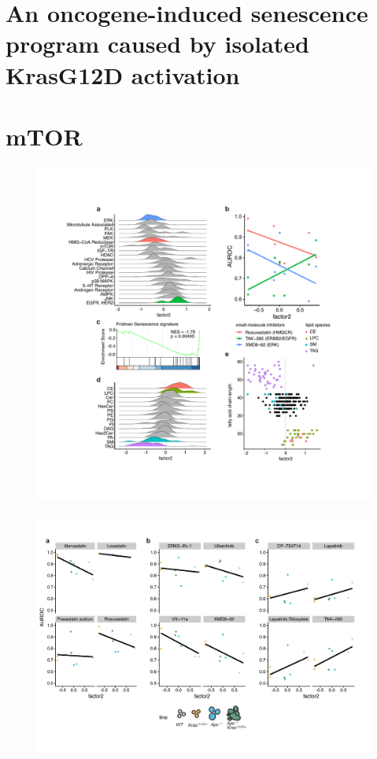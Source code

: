 \begin{flushleft}
\section{An oncogene-induced senescence program caused by isolated KrasG12D activation}


\section{mTOR}




\begin{figure}[h]
\centering
\includegraphics[width=\textwidth,
                height=\textheight,
                keepaspectratio]{figures/adenomaprofiling/pdf/fig_3_1.pdf}
\caption{}
\label{fig_180}
\end{figure}
\bigbreak

\begin{figure}[h]
\centering
\includegraphics[width=\textwidth,
                height=\textheight,
                keepaspectratio]{figures/adenomaprofiling/pdf/fig_3_2.pdf}
\caption{}
\label{fig_180}
\end{figure}
\bigbreak


\end{flushleft}
